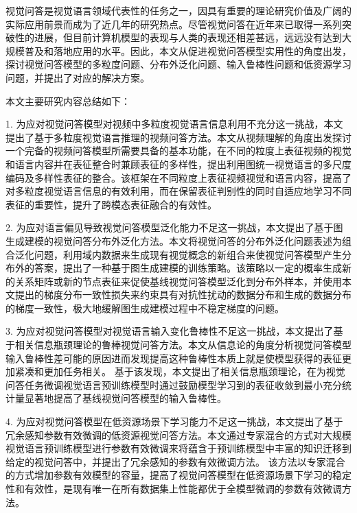 



视觉问答是视觉语言领域代表性的任务之一，因具有重要的理论研究价值及广阔的实际应用前景而成为了近几年的研究热点。尽管视觉问答在近年来已取得一系列突破性的进展，但目前计算机模型的表现与人类的表现还相差甚远，远远没有达到大规模普及和落地应用的水平。因此，本文从促进视觉问答模型实用性的角度出发，探讨视觉问答模型的多粒度问题、分布外泛化问题、输入鲁棒性问题和低资源学习问题，并提出了对应的解决方案。

本文主要研究内容总结如下：

1. 为应对视觉问答模型对视频中多粒度视觉语言信息利用不充分这一挑战，本文提出了基于多粒度视觉语言推理的视频问答方法。本文从视频理解的角度出发探讨一个完备的视频问答模型所需要具备的基本功能，在不同的粒度上表征视频的视觉和语言内容并在表征整合时兼顾表征的多样性，提出利用图统一视觉语言的多尺度编码及多样性表征的整合。该框架在不同粒度上表征视频视觉和语言内容，提高了对多粒度视觉语言信息的有效利用，而在保留表征判别性的同时自适应地学习不同表征的重要性，提升了跨模态表征融合的有效性。


2. 为应对语言偏见导致视觉问答模型泛化能力不足这一挑战，本文提出了基于图生成建模的视觉问答分布外泛化方法。本文将视觉问答的分布外泛化问题表述为组合泛化问题，利用域内数据来生成现有视觉概念的新组合来使视觉问答模型产生分布外的答案，提出了一种基于图生成建模的训练策略。该策略以一定的概率生成新的关系矩阵或新的节点表征来促使基线视觉问答模型泛化到分布外样本，并使用本文提出的梯度分布一致性损失来约束具有对抗性扰动的数据分布和生成的数据分布的梯度一致性，极大地缓解图生成建模过程中不稳定梯度的问题。


3. 为应对视觉问答模型对视觉语言输入变化鲁棒性不足这一挑战，本文提出了基于相关信息瓶颈理论的鲁棒视觉问答方法。本文从信息论的角度分析视觉问答模型输入鲁棒性差可能的原因进而发现提高这种鲁棒性本质上就是使模型获得的表征更加紧凑和更加任务相关。
基于该发现，本文提出了相关信息瓶颈理论，在为视觉问答任务微调视觉语言预训练模型时通过鼓励模型学习到的表征收敛到最小充分统计量显著地提高了基线视觉问答模型的输入鲁棒性。


4. 为应对视觉问答模型在低资源场景下学习能力不足这一挑战，本文提出了基于冗余感知参数有效微调的低资源视觉问答方法。本文通过专家混合的方式对大规模视觉语言预训练模型进行参数有效微调来将蕴含于预训练模型中丰富的知识迁移到给定的视觉问答中，并提出了冗余感知的参数有效微调方法。
该方法以专家混合的方式增加参数有效模型的容量，提高了视觉问答模型在低资源场景下学习的稳定性和有效性，是现有唯一在所有数据集上性能都优于全模型微调的参数有效微调方法。




